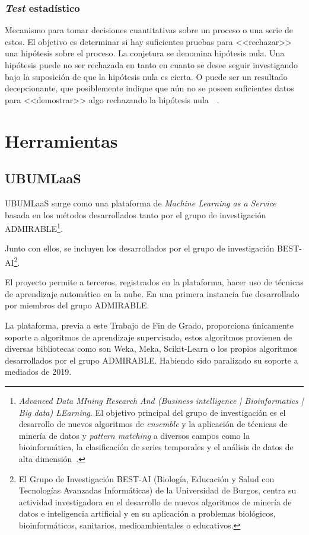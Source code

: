 \subsubsection{\textit{Test} estadístico}
Mecanismo para tomar decisiones cuantitativas sobre un proceso o una serie de estos. El objetivo es determinar si hay suficientes pruebas para <<rechazar>> una hipótesis sobre el proceso. La conjetura se denomina hipótesis nula. Una hipótesis puede no ser rechazada en tanto en cuanto se desee seguir investigando bajo la suposición de que la hipótesis nula es cierta. O puede ser un resultado decepcionante, que posiblemente indique que aún no se poseen suficientes datos para <<demostrar>> algo rechazando la hipótesis nula~\cite{lucon2018new}~\cite{nist}.

\section{Herramientas}\label{sec:herramientas}
\subsection{UBUMLaaS}\label{UBUMLaaS}
UBUMLaaS surge como una plataforma de \textit{Machine Learning as a Service} basada en los métodos desarrollados tanto por el grupo de investigación ADMIRABLE\footnote{\textit{Advanced Data MIning Research And (Business intelligence | Bioinformatics | Big data) LEarning}.  El objetivo principal del grupo de investigación es el desarrollo de nuevos algoritmos de \textit{ensemble} y la aplicación de técnicas de minería de datos y \textit{pattern matching} a diversos campos como la bioinformática, la clasificación de series temporales y el análisis de datos de alta dimensión~\cite{admirable_intro}.}.

Junto con ellos, se incluyen los desarrollados por el grupo de investigación BEST-AI\footnote{El Grupo de Investigación BEST-AI (Biología, Educación y Salud con Tecnologías Avanzadas Informáticas) de la Universidad de Burgos, centra su actividad investigadora en el desarrollo de nuevos algoritmos de minería de datos e inteligencia artificial y en su aplicación a problemas biológicos, bioinformáticos, sanitarios, medioambientales o educativos.}.

El proyecto permite a terceros, registrados en la plataforma, hacer uso de técnicas de aprendizaje automático en la nube. En una primera instancia fue desarrollado por miembros del grupo ADMIRABLE.

La plataforma, previa a este Trabajo de Fin de Grado, proporciona únicamente soporte a algoritmos de aprendizaje supervisado, estos algoritmos provienen de diversas bibliotecas como son Weka, Meka, Scikit-Learn o los propios algoritmos desarrollados por el grupo ADMIRABLE. Habiendo sido paralizado su soporte a mediados de 2019.


